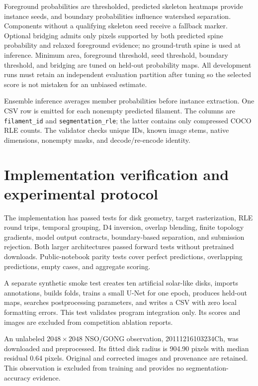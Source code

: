 \documentclass[conference]{IEEEtran}
\begin{document}
Foreground probabilities are thresholded, predicted skeleton heatmaps provide instance seeds, and boundary probabilities influence watershed separation. Components without a qualifying skeleton seed receive a fallback marker. Optional bridging admits only pixels supported by both predicted spine probability and relaxed foreground evidence; no ground-truth spine is used at inference. Minimum area, foreground threshold, seed threshold, boundary threshold, and bridging are tuned on held-out probability maps. All development runs must retain an independent evaluation partition after tuning so the selected score is not mistaken for an unbiased estimate.

Ensemble inference averages member probabilities before instance extraction. One CSV row is emitted for each nonempty predicted filament. The columns are \texttt{filament\_id} and \texttt{segmentation\_rle}; the latter contains only compressed COCO RLE counts. The validator checks unique IDs, known image stems, native dimensions, nonempty masks, and decode/re-encode identity.

\section{Implementation verification and experimental protocol}
The implementation has passed tests for disk geometry, target rasterization, RLE round trips, temporal grouping, D4 inversion, overlap blending, finite topology gradients, model output contracts, boundary-based separation, and submission rejection. Both larger architectures passed forward tests without pretrained downloads. Public-notebook parity tests cover perfect predictions, overlapping predictions, empty cases, and aggregate scoring.

A separate synthetic smoke test creates ten artificial solar-like disks, imports annotations, builds folds, trains a small U-Net for one epoch, produces held-out maps, searches postprocessing parameters, and writes a CSV with zero local formatting errors. This test validates program integration only. Its scores and images are excluded from competition ablation reports.

An unlabeled $2048\times2048$ NSO/GONG observation, 20111216103234Ch, was downloaded and preprocessed. Its fitted disk radius is 904.90 pixels with median residual 0.64 pixels. Original and corrected images and provenance are retained. This observation is excluded from training and provides no segmentation-accuracy evidence.
\end{document}
